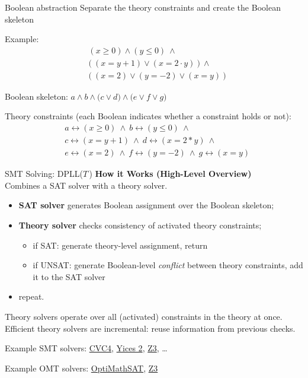 \documentclass{cons-beamer}
\begin{document}
\begin{frame}{Boolean abstraction}
  Separate the theory constraints and create the Boolean skeleton
  \vfill

  Example:
  \begin{align*}
    & (x \geq 0) \land (y \leq 0) ~\land \\
    & \big(~(x = y + 1) \lor (x = 2 \cdot y)~\big) ~\land \\
    & \big(~(x = 2) \lor (y = -2) \lor (x = y)~\big)
  \end{align*}

  Boolean skeleton:
  $a \land b \land \big(c \lor d\big) \land \big(e \lor f \lor g\big)$

  Theory constraints (each Boolean indicates whether a constraint holds or not):
  \begin{align*}
    &a \leftrightarrow (x \geq 0) ~\land~ b \leftrightarrow (y \leq 0) ~\land \\
    &c \leftrightarrow (x = y + 1) ~\land~ d \leftrightarrow (x = 2 * y) ~\land \\
    &e \leftrightarrow (x = 2) ~\land~ f \leftrightarrow (y = -2) ~\land~ g \leftrightarrow (x = y)
  \end{align*}
\end{frame}

\begin{frame}{SMT Solving: DPLL($T$\,)}
  \textbf{How it Works (High-Level Overview)} $ $\\
  Combines a SAT solver with a theory solver.
  \begin{itemize}
    \item \textbf{SAT solver} generates Boolean assignment over the Boolean skeleton;
    \item \textbf{Theory solver} checks consistency of activated theory constraints; \\
    \begin{itemize}
      \item if SAT: generate theory-level assignment, return
      \item if UNSAT: generate Boolean-level \textit{conflict} between theory constraints, add it to the SAT solver
    \end{itemize}
    \item repeat.
  \end{itemize}
  \vfill

  Theory solvers operate over all (activated) constraints in the theory at once. 
  Efficient theory solvers are incremental: reuse information from previous checks.
  \vfill

  Example SMT solvers: 
    \href{https://cvc4.github.io}{CVC4},
    \href{https://yices.csl.sri.com}{Yices 2},
    \href{https://github.com/Z3Prover/z3}{Z3}, \dots

  Example OMT solvers:
    \href{https://optimathsat.disi.unitn.it}{OptiMathSAT},
    \href{https://github.com/Z3Prover/z3}{Z3}
\end{frame}
\end{document}
